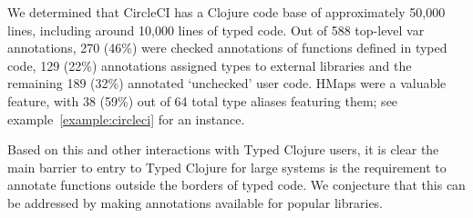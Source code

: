 We determined that
CircleCI has a Clojure code base of approximately 50,000 lines, including around 10,000 
lines of typed code.
Out of 588 top-level var annotations, 270 (46\%) were checked annotations of
functions defined in typed code,
129 (22\%) annotations assigned types to external libraries 
and the remaining 189 (32\%) annotated `unchecked' user code.
HMaps were a valuable feature, with 38 (59\%) out of 64 total type aliases
featuring them; see example~\ref{example:circleci} for an instance.

Based on this and other interactions with Typed Clojure users,
it is clear the main barrier to entry to Typed Clojure for large systems is the requirement
to annotate functions outside the borders of typed code.
We conjecture that this can be addressed by making annotations available for popular libraries.





